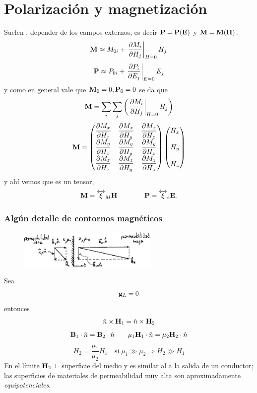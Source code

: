 \documentclass[10pt,oneside]{CBFT_book}
\begin{document}
\section{Polarización y magnetización}

Suelen , depender de los campos externos, es decir $\vb{P}=\vb{P}(\vb{E})$ y 
$\vb{M}=\vb{M}(\vb{H})$.
\[
	\vb{M} \approx M_{0i} + \left.\dpar{M_i}{H_j}\right|_{H=0} H_j
\]
\[
	\vb{P} \approx P_{0i} + \left.\dpar{P_i}{E_j}\right|_{E=0} E_j
\]
y como en general vale que $\vb{M}_0=0, \vb{P}_0=0$  se da que 
\[
	\vb{M} = \sum_i \sum_j \left( \left.\dpar{M_i}{H_j}\right|_{H=0} H_j \right) 
\]
\[
	\vb{M} = 
	\begin{pmatrix}
	 \displaystyle{\dpar{M_x}{H_x}} & \displaystyle{\dpar{M_x}{H_y}} & \displaystyle{\dpar{M_x}{H_z}} \\
	 \displaystyle{\dpar{M_y}{H_x}} & \displaystyle{\dpar{M_y}{H_y}} & \displaystyle{\dpar{M_y}{H_z}} \\
	 \displaystyle{\dpar{M_z}{H_x}} & \displaystyle{\dpar{M_z}{H_y}} & \displaystyle{\dpar{M_z}{H_z}}
	\end{pmatrix}
	\begin{pmatrix}
	 \displaystyle{H_x} \\
	 \\
	 H_y \\
	 \\
	 H_z
	\end{pmatrix}
\]
y ahí vemos que es un tensor,
\[
	\vb{M} = \overleftrightarrow{\xi}_M \vb{H} \qquad\qquad \vb{P} =  \overleftrightarrow{\xi}_e \vb{E}.
\]

\subsubsection{Algún detalle de contornos magnéticos}

\begin{figure}[htb]
	\begin{center}
	\includegraphics[width=0.6\textwidth]{images/fig_ft1_medios1.pdf}	 
	\end{center}
	\caption{}
\end{figure}
Sea
\[
	\vb{g}_L = 0 
\]
entonces
\[
	\hat{n}\times\vb{H}_1 = \hat{n}\times\vb{H}_2
\]
\[
	\vb{B}_1\cdot\hat{n} = \vb{B}_2\cdot\hat{n} \qquad
		\mu_1\vb{H}_1\cdot\hat{n} = \mu_2\vb{H}_2\cdot\hat{n}
\]
\[
	H_2 = \frac{\mu_1}{\mu_2} H_1 \quad \text{si} \; \mu_1 \gg \mu_2 \Rightarrow H_2 \gg H_1
\]
En el límite $\vb{H}_2 \perp$ superficie del medio y es similar al  a la salida de un
conductor; las superficies de materiales de permeabilidad muy alta son aproximadamente {\it equipotenciales}.
\end{document}

